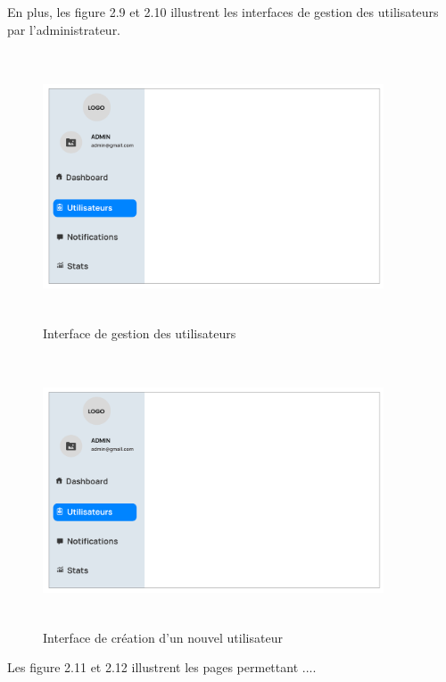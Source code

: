 \newpage
En plus, les figure 2.9 et 2.10 illustrent les interfaces de gestion des utilisateurs par l'administrateur.
\begin{figure}[h!]
  \centering
  \includegraphics[width=0.9\textwidth, height=8cm]{chap2.images/prot gestion user.png}
  \caption{Interface de gestion des utilisateurs}
\end{figure}
\begin{figure}[h!]
  \centering
  \includegraphics[width=0.9\textwidth, height=8cm]{chap2.images/prot gestion user.png}
  \caption{Interface de création d'un nouvel utilisateur}
\end{figure}

\newpage
Les figure 2.11 et 2.12 illustrent les  pages permettant ....

